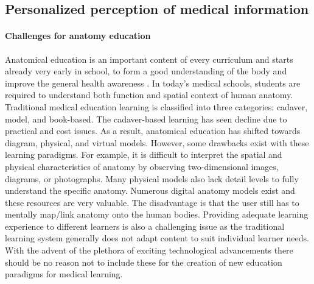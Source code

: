 \subsection{Personalized perception of medical information}
\paragraph{Challenges for anatomy education}
Anatomical education is an important content of every curriculum and starts already very early in school, to form a good understanding of the body and improve the general health awareness \cite{Dunnill2013}. In today's medical schools, students are required to understand both function and spatial context of human anatomy. Traditional medical education learning is classified into three categories: cadaver, model, and book-based. The cadaver-based learning has seen decline due to practical and cost issues. As a result, anatomical education has shifted towards diagram, physical, and virtual models. However, some drawbacks exist with these learning paradigms. For example, it is difficult to interpret the spatial and physical characteristics of anatomy by observing two-dimensional images, diagrams, or photographs. Many physical models also lack detail levels to fully understand the specific anatomy. 
Numerous digital anatomy models exist and these resources are very valuable. The disadvantage is that the user still has to mentally map/link anatomy onto the human bodies.
Providing adequate learning experience to different learners is also a challenging issue as the traditional learning system generally does not adapt content to suit individual learner needs.
With the advent of the plethora of exciting technological advancements there should be no reason not to include these for the creation of new education paradigms for medical learning. 

